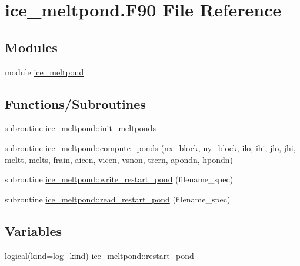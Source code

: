 \hypertarget{ice__meltpond_8F90}{
\section{ice\_\-meltpond.F90 File Reference}
\label{ice__meltpond_8F90}
}
\subsection*{Modules}
\begin{DoxyCompactItemize}
\item 
module \hyperlink{namespaceice__meltpond}{ice\_\-meltpond}
\end{DoxyCompactItemize}
\subsection*{Functions/Subroutines}
\begin{DoxyCompactItemize}
\item 
subroutine \hyperlink{namespaceice__meltpond_ac0d35a10ba7a39add524e51b1964a451}{ice\_\-meltpond::init\_\-meltponds}
\item 
subroutine \hyperlink{namespaceice__meltpond_a2d66a4a7c6f08732259cd3bd80998c9a}{ice\_\-meltpond::compute\_\-ponds} (nx\_\-block, ny\_\-block, ilo, ihi, jlo, jhi, meltt, melts, frain, aicen, vicen, vsnon, trcrn, apondn, hpondn)
\item 
subroutine \hyperlink{namespaceice__meltpond_a18dd3b2ba6582ac028a021de32f0e014}{ice\_\-meltpond::write\_\-restart\_\-pond} (filename\_\-spec)
\item 
subroutine \hyperlink{namespaceice__meltpond_abc1500e180d1775374ecff960c8ec825}{ice\_\-meltpond::read\_\-restart\_\-pond} (filename\_\-spec)
\end{DoxyCompactItemize}
\subsection*{Variables}
\begin{DoxyCompactItemize}
\item 
logical(kind=log\_\-kind) \hyperlink{namespaceice__meltpond_a5f576379fa33029c540bd3b3474f45c1}{ice\_\-meltpond::restart\_\-pond}
\end{DoxyCompactItemize}
